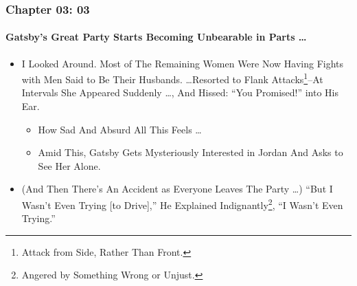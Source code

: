 \begin{frame}
\frametitle{Chapter 03: 03}
\framesubtitle{Gatsby's Great Party Starts Becoming Unbearable in Parts \dots}
\label{slide:chapter-03-03}
\begin{itemize}
\item I Looked Around. Most of The Remaining Women Were Now Having Fights with Men Said to Be Their Husbands. \dots Resorted to Flank Attacks\footnote{Attack from Side, Rather Than Front.}--At Intervals She Appeared Suddenly \dots, And Hissed: ``You Promised!'' into His Ear.
\begin{itemize}
\pause\item How Sad And Absurd All This Feels \dots
\pause\item Amid This, Gatsby Gets \alert{Mysteriously Interested in Jordan} And Asks to See Her Alone.
\end{itemize}
\pause\item (And Then There's An Accident as Everyone Leaves The Party \dots) ``But I Wasn't Even Trying [to Drive],'' He Explained Indignantly\footnote{Angered by Something Wrong or Unjust.}, ``I Wasn't Even Trying.''
\end{itemize}
\end{frame}
